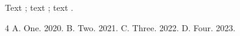 \documentclass{article}
\begin{document}
Text \cite{alpha,beta}; text \citet{gamma}; text \citep{delta}.
\begin{thebibliography}{4}
 A. One. 2020.
 B. Two. 2021.
 C. Three. 2022.
 D. Four. 2023.
\end{thebibliography}
\end{document}
